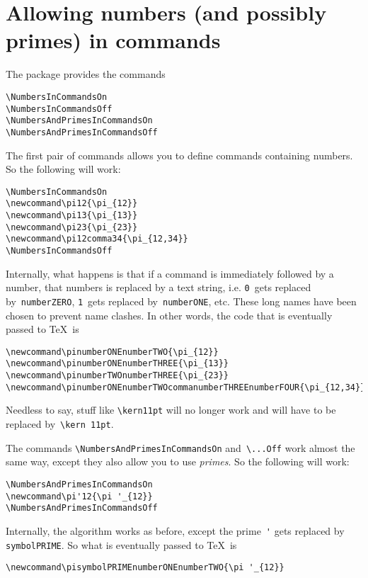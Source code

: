 \documentclass[a4paper,article,oneside,10pt]{memoir}
\begin{document}
\newpage

\chapter*{Allowing numbers (and possibly primes) in commands}

The package provides the commands
\begin{lstlisting}
\NumbersInCommandsOn
\NumbersInCommandsOff
\NumbersAndPrimesInCommandsOn
\NumbersAndPrimesInCommandsOff
\end{lstlisting}
The first pair of commands allows you to define commands containing numbers. So the following will work:
\begin{lstlisting}
\NumbersInCommandsOn
\newcommand\pi12{\pi_{12}}
\newcommand\pi13{\pi_{13}}
\newcommand\pi23{\pi_{23}}
\newcommand\pi12comma34{\pi_{12,34}}
\NumbersInCommandsOff
\end{lstlisting}
Internally, what happens is that if a command is immediately followed by a number,
that numbers is replaced by a text string, i.e.
\lstinline!0!~gets replaced by~\lstinline!numberZERO!,
\lstinline!1!~gets replaced by~\lstinline!numberONE!,
etc. These long names have been chosen to prevent name clashes.
In other words, the code that is eventually passed to \TeX\ is
\begin{lstlisting}
\newcommand\pinumberONEnumberTWO{\pi_{12}}
\newcommand\pinumberONEnumberTHREE{\pi_{13}}
\newcommand\pinumberTWOnumberTHREE{\pi_{23}}
\newcommand\pinumberONEnumberTWOcommanumberTHREEnumberFOUR{\pi_{12,34}}
\end{lstlisting}
Needless to say, stuff like \lstinline!\kern11pt! will no longer work and will have to be
replaced by~\lstinline!\kern 11pt!.

The commands \lstinline!\NumbersAndPrimesInCommandsOn! and~\lstinline!\...Off! work almost the same way, except they also allow
you to use \emph{primes}. So the following will work:
\begin{lstlisting}
\NumbersAndPrimesInCommandsOn
\newcommand\pi'12{\pi '_{12}}
\NumbersAndPrimesInCommandsOff
\end{lstlisting}
Internally, the algorithm works as before, except the prime~\lstinline!'! gets
replaced by \lstinline!symbolPRIME!. So what is eventually passed to \TeX\ is
\begin{lstlisting}
\newcommand\pisymbolPRIMEnumberONEnumberTWO{\pi '_{12}}
\end{lstlisting}
\end{document}
